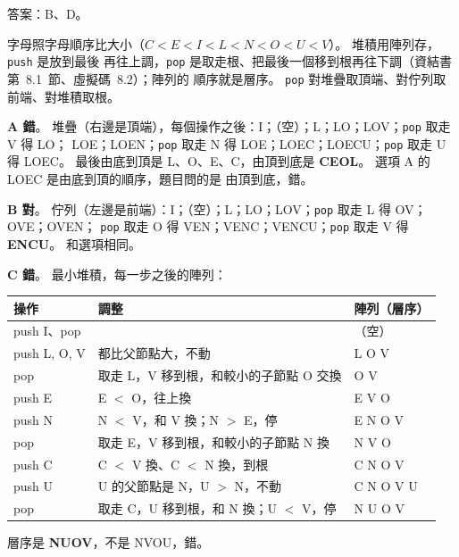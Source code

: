 \begin{pastsoln}
答案：B、D。

字母照字母順序比大小（$C < E < I < L < N < O < U < V$）。 堆積用陣列存，\texttt{push} 是放到最後
再往上調，\texttt{pop} 是取走根、把最後一個移到根再往下調（資結書第~8.1~節、虛擬碼~8.2）；陣列的
順序就是層序。 \texttt{pop} 對堆疊取頂端、對佇列取前端、對堆積取根。

\textbf{A 錯}。 堆疊（右邊是頂端），每個操作之後：I；（空）；L；LO；LOV；\texttt{pop} 取走 V 得 LO；
LOE；LOEN；\texttt{pop} 取走 N 得 LOE；LOEC；LOECU；\texttt{pop} 取走 U 得 LOEC。
最後由底到頂是 L、O、E、C，由頂到底是 \textbf{CEOL}。 選項 A 的 LOEC 是由底到頂的順序，題目問的是
由頂到底，錯。

\textbf{B 對}。 佇列（左邊是前端）：I；（空）；L；LO；LOV；\texttt{pop} 取走 L 得 OV；OVE；OVEN；
\texttt{pop} 取走 O 得 VEN；VENC；VENCU；\texttt{pop} 取走 V 得 \textbf{ENCU}。 和選項相同。

\textbf{C 錯}。 最小堆積，每一步之後的陣列：
\begin{center}
\small
\begin{tabular}{lll}
\toprule
操作 & 調整 & 陣列（層序） \\
\midrule
push I、pop & & （空） \\
push L, O, V & 都比父節點大，不動 & L O V \\
pop & 取走 L，V 移到根，和較小的子節點 O 交換 & O V \\
push E & E $<$ O，往上換 & E V O \\
push N & N $<$ V，和 V 換；N $>$ E，停 & E N O V \\
pop & 取走 E，V 移到根，和較小的子節點 N 換 & N V O \\
push C & C $<$ V 換、C $<$ N 換，到根 & C N O V \\
push U & U 的父節點是 N，U $>$ N，不動 & C N O V U \\
pop & 取走 C，U 移到根，和 N 換；U $<$ V，停 & N U O V \\
\bottomrule
\end{tabular}
\end{center}
層序是 \textbf{NUOV}，不是 NVOU，錯。


\end{pastsoln}
